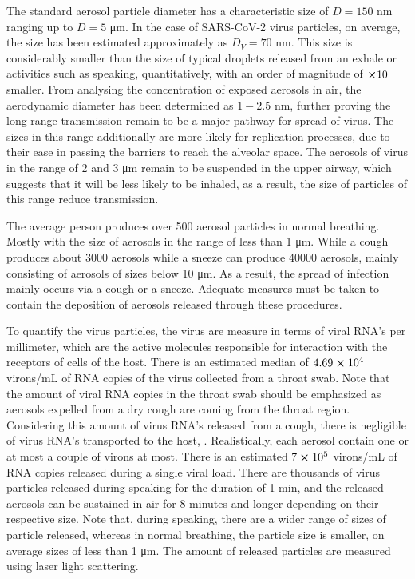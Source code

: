 \documentclass[11pt]{report}
\begin{document}
The standard aerosol particle diameter has a characteristic size of  $D= 150$  \si{\nano\meter} ranging up to $D= 5$ \si{\micro\meter}. In the case of SARS-CoV-2 virus particles, on average, the size has been estimated approximately as $D_V = 70$ \si{\nano\meter}. This size is considerably smaller than the size of typical droplets released from an exhale or activities such as speaking, quantitatively,  with an order of magnitude of $\cross 10$ smaller. From analysing the concentration of exposed aerosols in air, the aerodynamic diameter has been determined as $1-2.5$ \si{\nano\meter}, further proving the long-range transmission remain to be a major pathway for spread of virus. The sizes in this range additionally are more likely for replication processes, due to their ease in passing the barriers to reach the alveolar space. The aerosols of virus in the range of $2$ and $3$ \si{\micro\meter} remain to be suspended in the upper airway, which suggests that it will be less likely to be inhaled, as a result, the size of particles of this range reduce transmission.

The average person produces over 500 aerosol particles in normal breathing. Mostly with the size of aerosols in the range of less than 1 \si{\micro\meter}.  While a cough produces about 3000 aerosols while a sneeze can produce 40000 aerosols, mainly consisting of aerosols of sizes below 10 \si{\micro\meter}. As a result, the spread of infection mainly occurs via a cough or a sneeze. Adequate measures must be taken to contain the deposition of aerosols released through these procedures. 

To quantify the virus particles, the virus are measure in terms of viral RNA's per millimeter, which are the active molecules responsible for interaction with the receptors of cells of the host. There is an estimated median of $4.69 \cross 10^{4}$ virons/mL of RNA copies of the virus collected from a throat swab. Note that the amount of viral RNA copies in the throat swab should be emphasized as aerosols expelled from a dry cough are coming from the throat region. Considering this amount of virus RNA's released from a cough, there is negligible of virus RNA's transported to the host, . Realistically, each aerosol contain one or at most a couple of virons at most. There is an estimated $7 \cross 10^{5}$ virons/mL of RNA copies released during a single viral load. There are thousands of virus particles released during speaking for the duration of 1 \si{\minute}, and the released aerosols can be sustained in air for 8 minutes and longer depending on their respective size. Note that, during speaking, there are a wider range of sizes of particle released, whereas in normal breathing, the particle size is smaller, on average sizes of less than 1 \si{\micro\meter}. The amount of released particles are measured using laser light scattering. 
 
\end{document}
